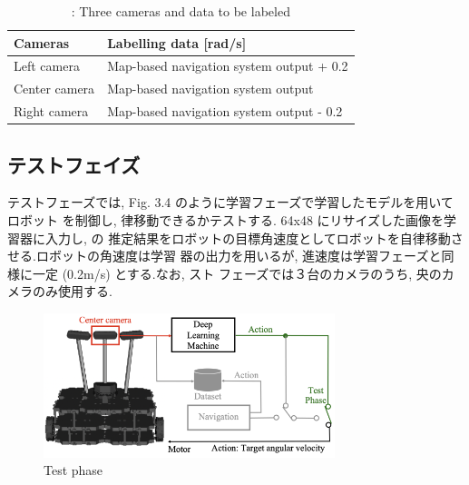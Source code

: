 \documentclass{jarticle}
\begin{document}
\begin{table}[htbp]
  \caption{: Three cameras and data to be labeled} \vspace*{3mm}
  \hspace*{-7mm}
  \begingroup
    \renewcommand{\arraystretch}{1.2}
    \begin{tabular}{|l|l|}
      \hline
      Cameras & Labelling data [rad/s] \\
      \hline
      Left camera & Map-based navigation system output + 0.2 \\
      Center camera & Map-based navigation system output \\
      Right camera & Map-based navigation system output - 0.2 \\
      \hline
    \end{tabular}
  \endgroup
\end {table}


\subsection{テストフェイズ}
テストフェーズでは, Fig. 3.4 のように学習フェーズで学習したモデルを用いてロボット
を制御し, 律移動できるかテストする. 64x48 にリサイズした画像を学習器に入力し, の
推定結果をロボットの目標角速度としてロボットを自律移動させる.ロボットの角速度は学習
器の出力を用いるが, 進速度は学習フェーズと同様に一定 (0.2m/s) とする.なお, スト
フェーズでは３台のカメラのうち, 央のカメラのみ使用する.

\begin{figure}[h!]
  \centering
   \includegraphics[height=42mm]{./figs/test.png}
   \vspace*{-4mm}
   \caption{Test phase}
\end{figure}
\end{document}
